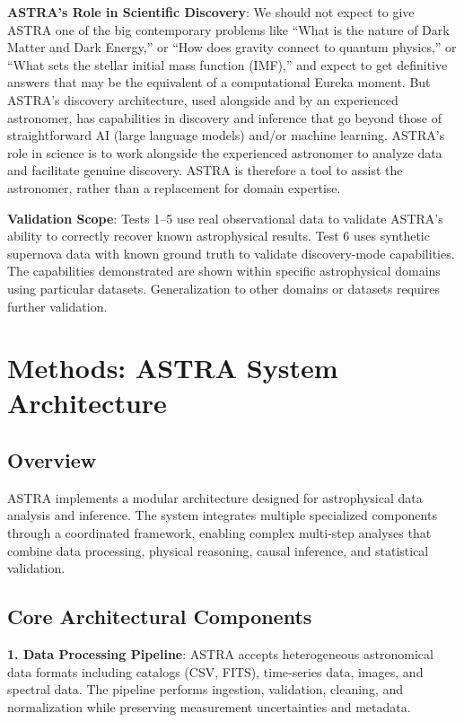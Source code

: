 \documentclass[usenatbib]{rasti}
\begin{document}
\textbf{ASTRA's Role in Scientific Discovery}: We should not expect to give ASTRA one of the big contemporary problems like ``What is the nature of Dark Matter and Dark Energy,'' or ``How does gravity connect to quantum physics,'' or ``What sets the stellar initial mass function (IMF),'' and expect to get definitive answers that may be the equivalent of a computational Eureka moment. But ASTRA's discovery architecture, used alongside and by an experienced astronomer, has capabilities in discovery and inference that go beyond those of straightforward AI (large language models) and/or machine learning. ASTRA's role in science is to work alongside the experienced astronomer to analyze data and facilitate genuine discovery. ASTRA is therefore a tool to assist the astronomer, rather than a replacement for domain expertise.

\textbf{Validation Scope}: Tests 1--5 use real observational data to validate ASTRA's ability to correctly recover known astrophysical results. Test 6 uses synthetic supernova data with known ground truth to validate discovery-mode capabilities. The capabilities demonstrated are shown within specific astrophysical domains using particular datasets. Generalization to other domains or datasets requires further validation.

\section{Methods: ASTRA System Architecture}

\subsection{Overview}

ASTRA implements a modular architecture designed for astrophysical data analysis and inference. The system integrates multiple specialized components through a coordinated framework, enabling complex multi-step analyses that combine data processing, physical reasoning, causal inference, and statistical validation.

\subsection{Core Architectural Components}

\textbf{1. Data Processing Pipeline}: ASTRA accepts heterogeneous astronomical data formats including catalogs (CSV, FITS), time-series data, images, and spectral data. The pipeline performs ingestion, validation, cleaning, and normalization while preserving measurement uncertainties and metadata.
\end{document}
